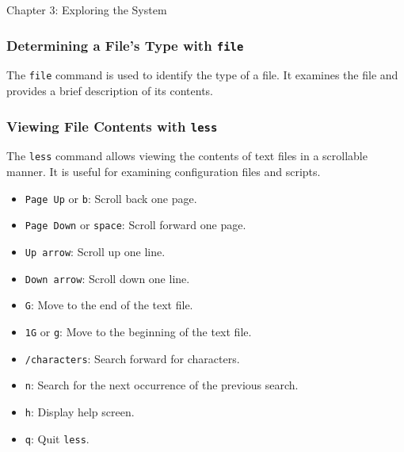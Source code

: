 \begin{notes}{Chapter 3: Exploring the System}
    \subsubsection*{Determining a File's Type with \texttt{file}}

    The \texttt{file} command is used to identify the type of a file. It examines the file and provides a brief description of its contents.

    \begin{highlight}
    \end{highlight}

    \subsubsection*{Viewing File Contents with \texttt{less}}

    The \texttt{less} command allows viewing the contents of text files in a scrollable manner. It is useful for examining configuration files and scripts.

    \begin{highlight}
    \begin{itemize}
        \item \texttt{Page Up} or \texttt{b}: Scroll back one page.
        \item \texttt{Page Down} or \texttt{space}: Scroll forward one page.
        \item \texttt{Up arrow}: Scroll up one line.
        \item \texttt{Down arrow}: Scroll down one line.
        \item \texttt{G}: Move to the end of the text file.
        \item \texttt{1G} or \texttt{g}: Move to the beginning of the text file.
        \item \texttt{/characters}: Search forward for characters.
        \item \texttt{n}: Search for the next occurrence of the previous search.
        \item \texttt{h}: Display help screen.
        \item \texttt{q}: Quit \texttt{less}.
    \end{itemize}
    \end{highlight}


\end{notes}
